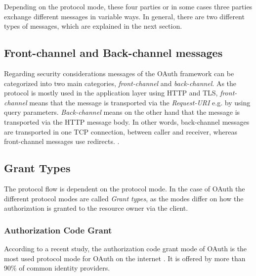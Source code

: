 \documentclass[
    fontsize=12pt,
    headings=small,
    parskip=half,           %
    bibliography=totoc,
    numbers=noenddot,       %
    open=any,               %
    ]{scrreprt}
\begin{document}
Depending on the protocol mode, these four parties or in some cases three
parties exchange different messages in variable ways. In general, there are two
different types of messages, which are explained in the next section.

\subsection{Front-channel and Back-channel messages}

Regarding security considerations messages of the OAuth framework can be
categorized into two main categories, \emph{front-channel} and
\emph{back-channel}. As the protocol is mostly used in the application layer
using HTTP and TLS, \emph{front-channel} means that the message is transported
via the \emph{Request-URI} \cite[Sec. 5.1.2]{fielding1999hypertext} e.g. by
using query parameters. \emph{Back-channel} means on the other hand that the
message is transported via the HTTP message body. In other words, back-channel
messages are transported in one TCP connection, between caller and receiver,
whereas front-channel messages use redirects. \cite[p. 338]{belfaik2022single}.

\subsection{Grant Types}
The protocol flow is dependent on the protocol mode. In the case of OAuth the
different protocol modes are called \emph{Grant types}, as the modes differ on
how the authorization is granted to the resource owner via the client.

\subsubsection{Authorization Code Grant}
According to a recent study, the authorization code grant mode of OAuth is the
most used protocol mode for OAuth on the internet
\cite[Table1]{philippaerts2022oauch}. It is offered by more than 90\% of common 
identity providers.
\end{document}
